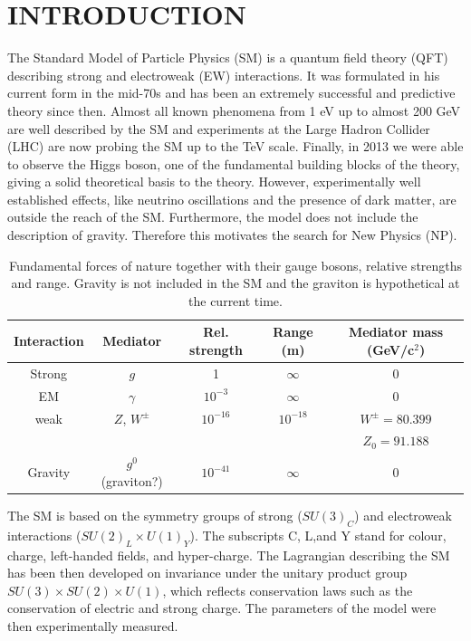 \chapter{INTRODUCTION}
\label{sec:Introduction}

The Standard Model of Particle Physics (SM) is a quantum field theory (QFT) describing strong and electroweak (EW) interactions.
It was formulated in his current form in the mid-70s and has been an extremely successful and predictive theory since then.
Almost all known phenomena from 1 eV up to almost 200 GeV are well described by the SM and experiments at the Large Hadron
Collider (LHC) are now probing the SM up to the TeV scale.
Finally, in 2013 we were able to observe the Higgs boson, one of the fundamental building blocks of the theory,
giving a solid theoretical basis to the theory. However, experimentally well established effects, like neutrino
oscillations and the presence of dark matter, are outside the reach of the SM. Furthermore, the model does not include
the description of gravity. Therefore this motivates the search for New Physics (NP).

\begin{table}[h!]
\label{interactions}
\begin{tabular}{|c|c|c|c|c|}
Interaction	& Mediator	& Rel. strength	& Range	(m)	& Mediator mass (GeV/c${}^2$) \\
\hline
Strong		& $g$		& 1			& $\infty$		& 0		\\
EM		& $\gamma$	& $10^{-3}$		& $\infty$ 		& 0		\\
weak		& $Z$, $W^\pm$	& $10^{-16}$		& $10^{-18}$	& $W^\pm = 80.399$ \\
		&		&			&		& $Z_0 = 91.188$	\\
Gravity		& $g^0$ (graviton?) & $10^{-41}$	& $\infty$		& 0		\\
\end{tabular}
\caption{Fundamental forces of nature together with their gauge bosons, relative strengths and range.
Gravity is not included in the SM and the graviton is hypothetical at the current time.}
\end{table}

The SM is based on the symmetry groups of strong ($SU(3)_C$) and electroweak interactions ($SU(2)_L \times U(1)_Y$).
The subscripts C, L,and Y stand for colour, charge, left-handed fields, and hyper-charge. The Lagrangian describing the
SM has been then developed on invariance under the unitary product group $SU(3) \times SU(2) \times U(1)$, which reflects
conservation laws such as the conservation of electric and strong charge.
The parameters of the model were then experimentally measured.


